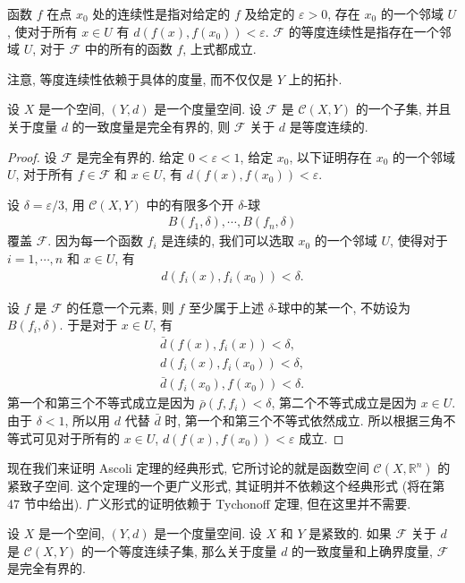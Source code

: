 \documentclass[../../main.tex]{subfiles}
\begin{document}
函数 $f$ 在点 $x_0$ 处的连续性是指对给定的 $f$ 及给定的 $\varepsilon>0$, 存在 $x_0$ 的一个邻域 $U$, 使对于所有 $x\in U$ 有 $d(f(x),f(x_0))<\varepsilon$. $\mathcal{F}$ 的等度连续性是指存在一个邻域 $U$, 对于 $\mathcal{F}$ 中的所有的函数 $f$, 上式都成立.

注意, 等度连续性依赖于具体的度量, 而不仅仅是 $Y$ 上的拓扑.

\begin{lemma}\label{lemma:ch07-totally-bounded-equicontinuous}
设 $X$ 是一个空间, $(Y,d)$ 是一个度量空间. 设 $\mathcal{F}$ 是 $\mathcal{C}(X,Y)$ 的一个子集, 并且关于度量 $d$ 的一致度量是完全有界的, 则 $\mathcal{F}$ 关于 $d$ 是等度连续的.
\end{lemma}

\begin{proof}
设 $\mathcal{F}$ 是完全有界的. 给定 $0<\varepsilon<1$, 给定 $x_0$, 以下证明存在 $x_0$ 的一个邻域 $U$, 对于所有 $f\in\mathcal{F}$ 和 $x\in U$, 有 $d(f(x),f(x_0))<\varepsilon$.

设 $\delta=\varepsilon/3$, 用 $\mathcal{C}(X,Y)$ 中的有限多个开 $\delta$-球
\begin{align*}
B(f_1,\delta),\cdots,B(f_n,\delta)
\end{align*}
覆盖 $\mathcal{F}$. 因为每一个函数 $f_i$ 是连续的, 我们可以选取 $x_0$ 的一个邻域 $U$, 使得对于 $i=1,\cdots,n$ 和 $x\in U$, 有
\begin{align*}
d(f_i(x),f_i(x_0))<\delta.
\end{align*}

设 $f$ 是 $\mathcal{F}$ 的任意一个元素, 则 $f$ 至少属于上述 $\delta$-球中的某一个, 不妨设为 $B(f_i,\delta)$. 于是对于 $x\in U$, 有
\begin{align*}
\bar{d}(f(x),f_i(x))<\delta,\\
d(f_i(x),f_i(x_0))<\delta,\\
\bar{d}(f_i(x_0),f(x_0))<\delta.
\end{align*}
第一个和第三个不等式成立是因为 $\bar{\rho}(f,f_i)<\delta$, 第二个不等式成立是因为 $x\in U$. 由于 $\delta<1$, 所以用 $d$ 代替 $\bar{d}$ 时, 第一个和第三个不等式依然成立. 所以根据三角不等式可见对于所有的 $x\in U$, $d(f(x),f(x_0))<\varepsilon$ 成立.
\end{proof}

现在我们来证明 Ascoli 定理的经典形式, 它所讨论的就是函数空间 $\mathcal{C}(X,\mathbb{R}^n)$ 的紧致子空间. 这个定理的一个更广义形式, 其证明并不依赖这个经典形式 (将在第 47 节中给出). 广义形式的证明依赖于 Tychonoff 定理, 但在这里并不需要.

\begin{lemma}\label{lemma:ch07-equicontinuous-totally-bounded}
设 $X$ 是一个空间, $(Y,d)$ 是一个度量空间. 设 $X$ 和 $Y$ 是紧致的. 如果 $\mathcal{F}$ 关于 $d$ 是 $\mathcal{C}(X,Y)$ 的一个等度连续子集, 那么关于度量 $d$ 的一致度量和上确界度量, $\mathcal{F}$ 是完全有界的.
\end{lemma}
\end{document}
